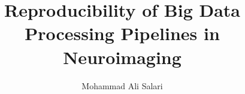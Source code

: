 \author{Mohammad Ali Salari}
\title{Reproducibility of Big Data Processing Pipelines in Neuroimaging }

\PhD                            %
